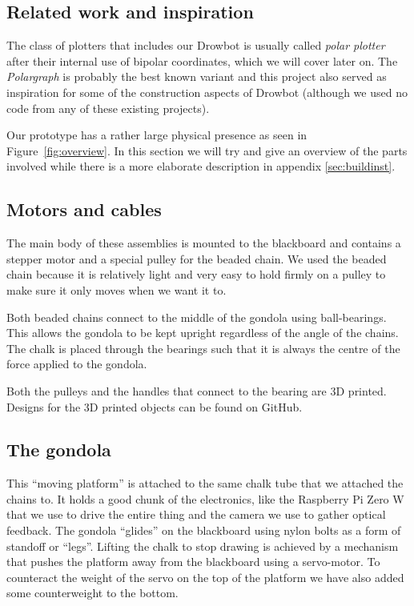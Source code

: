 \documentclass[a4paper,10pt]{article}
\begin{document}
\subsection*{Related work and inspiration}
The class of plotters that includes our Drowbot is usually called \emph{polar plotter} after their internal use
of bipolar coordinates, which we will cover later on.
The \emph{Polargraph} \cite{polargraphsite} is probably the best known variant and this project also served as inspiration for some of the construction aspects of Drowbot (although we used no code from any of these existing projects).



Our prototype has a rather large physical presence as seen in Figure~\ref{fig:overview}.
In this section we will try and give an overview of the parts involved
while there is a more elaborate description in appendix \ref{sec:buildinst}.

\subsection*{Motors and cables}
The main body of these assemblies is mounted to the blackboard and
contains a stepper motor and a special pulley for the beaded chain.
We used the beaded chain because it is relatively light and very
easy to hold firmly on a pulley to make sure it only moves when
we want it to.

Both beaded chains connect to the middle of the gondola using ball-bearings.
This allows the gondola to be kept upright regardless of the angle of the chains.
The chalk is placed through the bearings such that it is always the centre of the force applied to the gondola.

Both the pulleys and the handles that connect to the bearing are 3D printed. Designs for the 3D printed objects can be found on GitHub\cite{github}.

\subsection*{The gondola}
This ``moving platform'' is attached to the same chalk tube that we attached
the chains to.
It holds a good chunk of the electronics, like the Raspberry Pi Zero W
that we use to drive the entire thing and the camera we use to gather
optical feedback.
The gondola ``glides'' on the blackboard using nylon bolts as a form of
standoff or ``legs''.
Lifting the chalk to stop drawing is achieved by a mechanism that pushes the platform away from the
blackboard using a servo-motor.
To counteract the weight of the servo on the top of the platform
we have also added some counterweight to the bottom.
\end{document}
